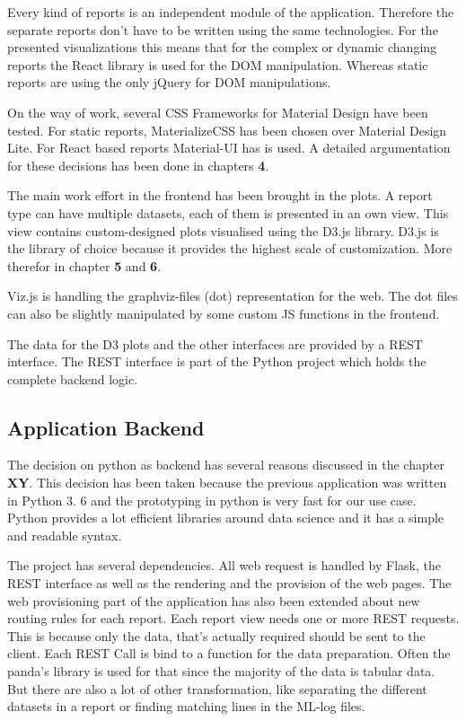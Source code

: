 \documentclass[american,a4paper,oneside,,tablecaptionabove]{scrbook}
\begin{document}
Every kind of reports is an independent module of the application.
Therefore the separate reports don't have to be written using the same
technologies. For the presented visualizations this means that for the
complex or dynamic changing reports the React library is used for the
DOM manipulation. Whereas static reports are using the only jQuery for
DOM manipulations.

On the way of work, several CSS Frameworks for Material Design have been
tested. For static reports, MaterializeCSS has been chosen over Material
Design Lite. For React based reports Material-UI has is used. A detailed
argumentation for these decisions has been done in chapters \textbf{4}.

The main work effort in the frontend has been brought in the plots. A
report type can have multiple datasets, each of them is presented in an
own view. This view contains custom-designed plots visualised using the
D3.js library. D3.js is the library of choice because it provides the
highest scale of customization. More therefor in chapter \textbf{5} and
\textbf{6}.

Viz.js is handling the graphviz-files (dot) representation for the web.
The dot files can also be slightly manipulated by some custom JS
functions in the frontend.

The data for the D3 plots and the other interfaces are provided by a
REST interface. The REST interface is part of the Python project which
holds the complete backend logic.

\subsection{Application Backend}\label{application-backend}

The decision on python as backend has several reasons discussed in the
chapter \textbf{XY}. This decision has been taken because the previous
application was written in Python 3. 6 and the prototyping in python is
very fast for our use case. Python provides a lot efficient libraries
around data science and it has a simple and readable syntax.

The project has several dependencies. All web request is handled by
Flask, the REST interface as well as the rendering and the provision of
the web pages. The web provisioning part of the application has also
been extended about new routing rules for each report. Each report view
needs one or more REST requests. This is because only the data, that's
actually required should be sent to the client. Each REST Call is bind
to a function for the data preparation. Often the panda's library is
used for that since the majority of the data is tabular data. But there
are also a lot of other transformation, like separating the different
datasets in a report or finding matching lines in the ML-log files.
\end{document}
